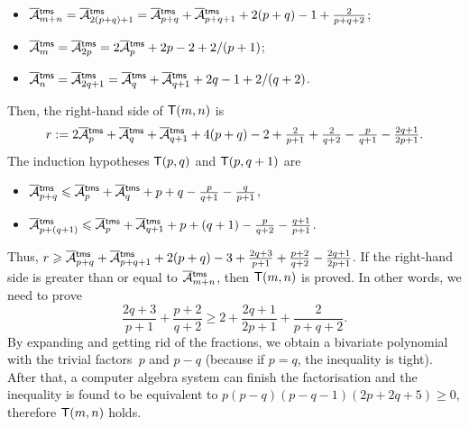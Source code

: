 \begin{enumerate}
\begin{itemize}
      \item \(\OM{\fun{tms}}{m+n} = \OM{\fun{tms}}{2(p+q)+1} =
        \OM{\fun{tms}}{p+q} + \OM{\fun{tms}}{p+q+1} + 2(p+q) - 1 +
        \tfrac{2}{p+q+2}\);

      \item \(\OM{\fun{tms}}{m} = \OM{\fun{tms}}{2p} =
        2\OM{\fun{tms}}{p} + 2p - 2 + 2/(p+1)\);

      \item \(\OM{\fun{tms}}{n} = \OM{\fun{tms}}{2q+1} =
        \OM{\fun{tms}}{q} + \OM{\fun{tms}}{q+1} + 2q - 1 + 2/(q+2)\).

    \end{itemize}
    Then, the right\hyp{}hand side of \(\textsf{T}({m,n})\) is
    \begin{equation*}
      r := 2\OM{\fun{tms}}{p} + \OM{\fun{tms}}{q} +
      \OM{\fun{tms}}{q+1} + 4(p+q) - 2 + \tfrac{2}{p+1} +
      \tfrac{2}{q+2} - \tfrac{p}{q+1} - \tfrac{2q+1}{2p+1}.
    \end{equation*}
    The induction hypotheses \(\textsf{T}({p,q})\) and \(\textsf{T}({p,q+1})\)
    are
    \begin{itemize}

      \item \(\OM{\fun{tms}}{p+q} \leqslant \OM{\fun{tms}}{p} +
      \OM{\fun{tms}}{q} + p + q - \frac{p}{q+1} - \frac{q}{p+1}\),

      \item \(\OM{\fun{tms}}{p+(q+1)} \leqslant \OM{\fun{tms}}{p} +
      \OM{\fun{tms}}{q+1} + p + (q + 1) - \frac{p}{q+2} -
      \frac{q+1}{p+1}\).

    \end{itemize}
    Thus, \(r \geqslant \OM{\fun{tms}}{p+q} + \OM{\fun{tms}}{p+q+1} +
    2(p+q) - 3 + \tfrac{2q+3}{p+1} + \tfrac{p+2}{q+2} -
    \tfrac{2q+1}{2p+1}\). If the right\hyp{}hand side is greater than
    or equal to \(\OM{\fun{tms}}{m+n}\), then \(\textsf{T}({m,n})\) is
    proved. In other words, we need to prove
    \begin{equation*}
      \frac{2q+3}{p+1} + \frac{p+2}{q+2} \geqslant 2 +
      \frac{2q+1}{2p+1} + \frac{2}{p+q+2}.
    \end{equation*}
    By expanding and getting rid of the fractions, we obtain a
    bivariate polynomial with the trivial factors~\(p\) and \(p-q\)
    (because if \(p=q\), the inequality is tight). After that, a
    computer algebra system can finish the factorisation and the
    inequality is found to be equivalent to \(p(p-q)(p-q-1)(2p+2q+5)
    \geqslant 0\), therefore \(\textsf{T}({m,n})\) holds.


\end{enumerate}
